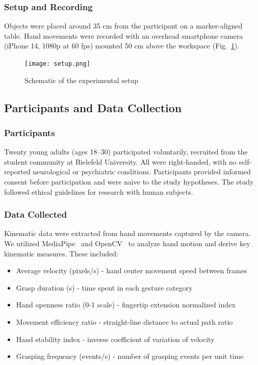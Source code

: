 \documentclass[conference]{IEEEtran}
\begin{document}
\subsubsection{Setup and Recording}

Objects were placed around 35 cm from the participant on a marker-aligned table. Hand movements were recorded with an overhead smartphone camera (iPhone 14, 1080p at 60 fps) mounted 50 cm above the workspace (Fig.~\ref{fig:setup}).

\begin{figure}[H]
    \centering
    \texttt{[image: setup.png]}
    \caption{Schematic of the experimental setup}
    \label{fig:setup}
\end{figure}


\subsection{Participants and Data Collection}
\subsubsection{Participants}
Twenty young adults (ages 18–30) participated voluntarily, recruited from the student community at Bielefeld University. All were right-handed, with no self-reported neurological or psychiatric conditions. Participants provided informed consent before participation and were naive to the study hypotheses. The study followed ethical guidelines for research with human subjects.

\subsubsection{Data Collected}
Kinematic data were extracted from hand movements captured by the camera. We utilized MediaPipe~\cite{mediapipe2019} and OpenCV~\cite{opencv2015} to analyze hand motion and derive key kinematic measures. These included:

\begin{itemize}
    \item Average velocity (pixels/s) - hand center movement speed between frames
    \item Grasp duration (s) - time spent in each gesture category
    \item Hand openness ratio (0-1 scale) - fingertip extension normalized index
    \item Movement efficiency ratio - straight-line distance to actual path ratio
    \item Hand stability index - inverse coefficient of variation of velocity
    \item Grasping frequency (events/s) - number of grasping events per unit time
\end{itemize}
\end{document}
